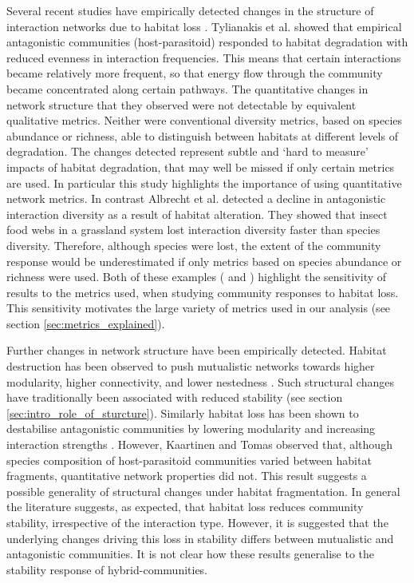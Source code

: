 Several recent studies have empirically detected changes in the structure of interaction networks due to habitat loss \cite{hagen2012biodiversity}. Tylianakis et al. \cite{tylianakis2007habitat} showed that empirical antagonistic communities (host-parasitoid) responded to habitat degradation with reduced evenness in interaction frequencies. This means that certain interactions became relatively more frequent, so that energy flow through the community became concentrated along certain pathways. The quantitative changes in network structure that they observed were not detectable by equivalent qualitative metrics. Neither were conventional diversity metrics, based on species abundance or richness, able to distinguish between habitats at different levels of degradation. The changes detected represent subtle and `hard to measure' impacts of habitat degradation, that may well be missed if only certain metrics are used. In particular this study highlights the importance of using quantitative network metrics. In contrast Albrecht et al. \cite{albrecht2007interaction} detected a decline in antagonistic interaction diversity as a result of habitat alteration. They showed that insect food webs in a grassland system lost interaction diversity faster than species diversity. Therefore, although species were lost, the extent of the community response would be underestimated if only metrics based on species abundance or richness were used. Both of these examples (\cite{tylianakis2007habitat} and \cite{albrecht2007interaction}) highlight the sensitivity of results to the metrics used, when studying community responses to habitat loss. This sensitivity motivates the large variety of metrics used in our analysis (see section \ref{sec:metrics_explained}).

Further changes in network structure have been empirically detected. Habitat destruction has been observed to push mutualistic networks towards higher modularity, higher connectivity, and lower nestedness \cite{spiesman2013habitat}. Such structural changes have traditionally been associated with reduced stability (see section \ref{sec:intro_role_of_sturcture}). Similarly habitat loss has been shown to destabilise antagonistic communities by lowering modularity and increasing interaction strengths \cite{hagen2012biodiversity}. However, Kaartinen and Tomas \cite{kaartinen2011shrinking} observed that, although species composition of host-parasitoid communities varied between habitat fragments, quantitative network properties did not. This result suggests a possible generality of structural changes under habitat fragmentation. In general the literature suggests, as expected, that habitat loss reduces community stability, irrespective of the interaction type. However, it is suggested that the underlying changes driving this loss in stability differs between mutualistic and antagonistic communities. It is not clear how these results generalise to the stability response of hybrid-communities. 


